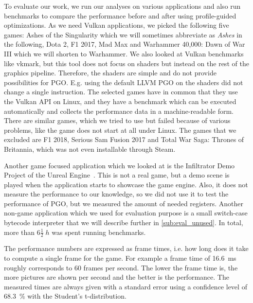\clearpage
{}
To evaluate our work, we run our analyses on various applications and also run benchmarks to compare the performance before and after using profile-guided optimizations.
As we need Vulkan applications, we picked the following five games:
Ashes of the Singularity which we will sometimes abbreviate as \emph{Ashes} in the following, Dota 2, F1 2017, Mad Max and Warhammer 40,000: Dawn of War III which we will shorten to Warhammer.
We also looked at Vulkan benchmarks like vkmark, but this tool does not focus on shaders but instead on the rest of the graphics pipeline.
Therefore, the shaders are simple and do not provide possibilities for PGO. E.g. using the default LLVM PGO on the shaders did not change a single instruction.
The selected games have in common that they use the Vulkan API on Linux, and they have a benchmark which can be executed automatically and collects the performance data in a machine-readable form.
There are similar games, which we tried to use but failed because of various problems, like the game does not start at all under Linux.
The games that we excluded are F1 2018, Serious Sam Fusion 2017 and Total War Saga: Thrones of Britannia, which was not even installable through Steam.

Another game focused application which we looked at is the Infiltrator Demo Project of the Unreal Engine~\cite{Games2015}.
This is not a real game, but a demo scene is played when the application starts to showcase the game engine.
Also, it does not measure the performance to our knowledge, so we did not use it to test the performance of PGO, but we measured the amount of needed registers.
Another non-game application which we used for evaluation purpose is a small switch-case bytecode interpreter that we will describe further in \cref{sub:eval_unused}.
In total, more than $6 \frac{1}{2}\;\si{h}$ was spent running benchmarks.

The performance numbers are expressed as frame times, i.e. how long does it take to compute a single frame for the game.
For example a frame time of \SI{16.6}{\milli\second} roughly corresponds to 60 frames per second.
The lower the frame time is, the more pictures are shown per second and the better is the performance.
The measured times are always given with a standard error using a confidence level of \SI{68.3}{\percent} with the Student's t-distribution.

